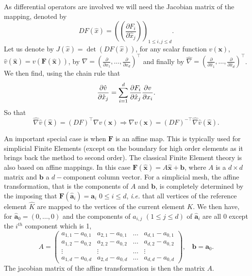As differential operators are involved we will need the Jacobian matrix of the mapping, denoted by 
$$DF(\hat{x})=\left(\left(\frac{\partial F_i}{\partial \hat{x}_j}\right)\right)_{1\leq i,j\leq d} .$$ Let us denote by
$J( \hat{x})= \det  (DF(\hat{x}))$, for any scalar function 
$v( \mathbf{x})$, $\hat{v}( \hat{ \mathbf{x} }) = v(\mathbf{F}(\hat{ \mathbf{x} }))$, by
 $\nabla=(\frac{\partial }{\partial x_1},\dots, \frac{\partial }{\partial x_d} )^\top$ and finally by $\hat{\nabla}=(\frac{\partial }{\partial \hat{x}_1}, \dots , \frac{\partial}{\partial \hat{x}_d})^\top$. We then find, using the chain 
 rule that
 $$ \frac{\partial \hat{v}}{\partial \hat{x}_j} = \sum_{i=1}^d  \frac{\partial F_i}{\partial \hat{x}_j} \frac{\partial v}{\partial x_i}.$$
 So that
\begin{equation}\label{eq:derchvar}
\hat{\nabla} \hat{v} (\hat{ \mathbf{x}}) =(DF)^{\top}\nabla v ( \mathbf{x}) \Rightarrow \nabla v ( \mathbf{x})= (DF)^{-\top} \hat{\nabla} \hat{v} (\hat{ \mathbf{x}}).
\end{equation}

An important special case is when  $\mathbf{F}$ is an affine map. This is typically used for simplicial Finite Elements (except on the boundary for high order elements as it brings back the method to second order).
The classical Finite Element theory is also based on affine mappings. In this case
$\mathbf{F}( \hat{\mathbf{x}}) = A \hat{\mathbf{x}} + \mathbf{b} $, where $A$ is a $d\times d$ matrix and $ \mathbf{b}$ a $d-$component column vector. For a simplicial mesh, the affine transformation, that is the components of $A$ and $ \mathbf{b}$, is completely determined by the imposing that $\mathbf{F}( \hat{\mathbf{a}}_i) = \mathbf{a}_i$ $0\leq i\leq d$, \textit{i.e.} that all vertices of the reference element $\hat{K}$ are mapped to the vertices of the current element $K$. We then have, for $ \hat{\mathbf{a}}_0 =(0,\dots, 0)$
and the components of $a_{i,j}$ $(1\leq j \leq d)$ of $\hat{\mathbf{a}}_i$ are all 0 except the $i^{th}$ component which is 1,
$$ A =\begin{pmatrix} a_{1,1} - a_{0,1} & a_{2,1} - a_{0,1} & \dots & a_{d,1} - a_{0,1}\\
a_{1,2} - a_{0,2} & a_{2,2} - a_{0,2} & \dots & a_{d,2} - a_{0,2}\\
\vdots & \vdots & \dots &\vdots \\
a_{1,d} - a_{0,d} & a_{2,d} - a_{0,d} & \dots & a_{d,d} - a_{0,d}
\end{pmatrix}, ~~~~ \mathbf{b} = \mathbf{a}_0.$$
The jacobian matrix of the affine transformation is then the matrix $A$.

